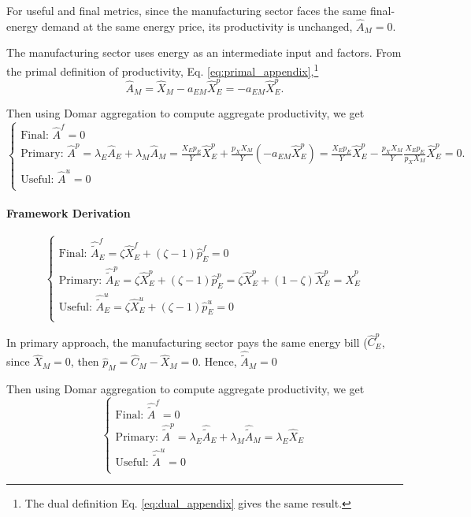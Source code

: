 \documentclass[11pt]{article}
\begin{document}
For useful and final metrics, since the manufacturing sector faces the same final-energy demand at the same energy price, its productivity is unchanged, $\hat{A}_M=0$. 

The manufacturing sector uses energy as an intermediate input and factors. 
From the primal definition of productivity, Eq. \ref{eq:primal_appendix},\footnote{The dual definition Eq. \ref{eq:dual_appendix} gives the same result.}
\begin{equation*}
   \hat{A}_M= \hat{X}_M-a_{EM}\hat{X}_E^p= -a_{EM}\hat{X}_E^p.
\end{equation*}

Then using Domar aggregation to compute aggregate productivity, we get 
\begin{equation*}
    \begin{cases}
        \text{Final: }\hat{A}^f=0\\
         \text{Primary: }\hat{A}^p=\lambda_E \hat{A}_E+\lambda_M \hat{A}_M=\frac{X_Ep_E}{Y} \hat{X}_E^p+ \frac{p_XX_M}{Y} (-a_{EM}\hat{X}_E^p)=\frac{X_Ep_E}{Y} \hat{X}_E^p - \frac{p_XX_M}{Y} \frac{X_Ep_E}{p_XX_M}\hat{X}_E^p=0.\\
        \text{Useful: }\hat{A}^u=0  \\
    \end{cases}
\end{equation*}



\paragraph{Framework Derivation}

\begin{equation*}
    \begin{cases}
        \text{Final: }\hat{\tilde{A}}_E^f=\zeta \hat{X}_E^f+(\zeta-1) \hat{p}_E^f=0\\
         \text{Primary: }\hat{\tilde{A}}_E^p=\zeta \hat{X}_E^p+(\zeta-1) \hat{p}_E^p=\zeta \hat{X}_E^p+(1-\zeta) \hat{X}_E^p=\hat{X}_E^p\\
        \text{Useful: } \hat{\tilde{A}}_E^u=\zeta \hat{X}_E^u+(\zeta-1) \hat{p}_E^u=0  \\
    \end{cases}
\end{equation*}


In primary approach, the manufacturing sector pays the same energy bill ($\hat{C}_E^p$, since $\hat{X}_M=0$, then $\hat{p}_M=\hat{C}_M-\hat{X}_M= 0$.
Hence, $\hat{\tilde{A}}_M=0$

Then using Domar aggregation to compute aggregate productivity, we get 
\begin{equation*}
    \begin{cases}
        \text{Final: }\hat{\tilde{A}}^f=0\\
         \text{Primary: }\hat{\tilde{A}}^p=\lambda_E \hat{\tilde{A}}_E+\lambda_M \hat{\tilde{A}}_M=\lambda_E \hat{X}_E\\
        \text{Useful: }\hat{\tilde{A}}^u=0  \\
    \end{cases}
\end{equation*}
\end{document}
